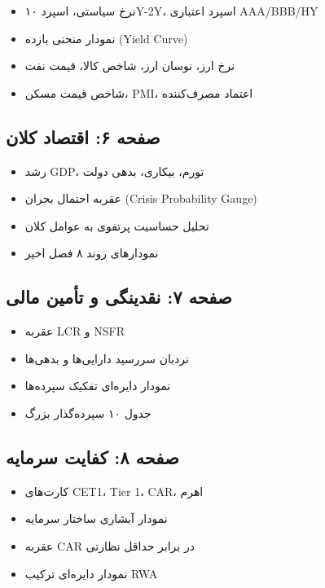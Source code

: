 \documentclass[12pt,a4paper]{article}
\begin{document}
\begin{itemize}
    \item نرخ سیاستی، اسپرد ۱۰Y-2Y، اسپرد اعتباری AAA/BBB/HY
    \item نمودار منحنی بازده (Yield Curve)
    \item نرخ ارز، نوسان ارز، شاخص کالا، قیمت نفت
    \item شاخص قیمت مسکن، PMI، اعتماد مصرف‌کننده
\end{itemize}

\subsection{صفحه ۶: اقتصاد کلان}

\begin{itemize}
    \item رشد GDP، تورم، بیکاری، بدهی دولت
    \item عقربه احتمال بحران (Crisis Probability Gauge)
    \item تحلیل حساسیت پرتفوی به عوامل کلان
    \item نمودارهای روند ۸ فصل اخیر
\end{itemize}

\subsection{صفحه ۷: نقدینگی و تأمین مالی}

\begin{itemize}
    \item عقربه LCR و NSFR
    \item نردبان سررسید دارایی‌ها و بدهی‌ها
    \item نمودار دایره‌ای تفکیک سپرده‌ها
    \item جدول ۱۰ سپرده‌گذار بزرگ
\end{itemize}

\subsection{صفحه ۸: کفایت سرمایه}

\begin{itemize}
    \item کارت‌های CET1، Tier 1، CAR، اهرم
    \item نمودار آبشاری ساختار سرمایه
    \item عقربه CAR در برابر حداقل نظارتی
    \item نمودار دایره‌ای ترکیب RWA
\end{itemize}
\end{document}
